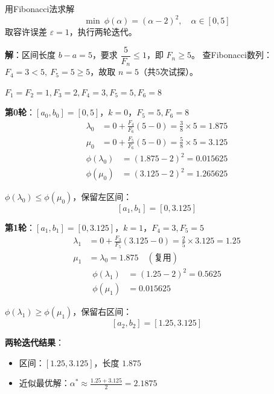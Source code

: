 \begin{example}\label{ex:fibonacci}
用Fibonacci法求解
\[
\min\ \phi(\alpha) = (\alpha - 2)^2,\quad \alpha \in [0, 5]
\]
取容许误差 $\varepsilon = 1$，执行两轮迭代。

\textbf{解}：区间长度 $b-a = 5$，要求 $\dfrac{5}{F_n} \leq 1$，即 $F_n \geq 5$。
查Fibonacci数列：$F_4=3 < 5,\ F_5=5 \geq 5$，故取 $n = 5$（共5次试探）。

$F_1=F_2=1, F_3=2, F_4=3, F_5=5, F_6=8$

\textbf{第0轮}：$[a_0, b_0] = [0, 5]$，$k=0$，$F_{5}=5, F_{6}=8$
\begin{align*}
\lambda_0 &= 0 + \frac{F_4}{F_6}(5-0) = \frac{3}{8} \times 5 = 1.875 \\
\mu_0 &= 0 + \frac{F_5}{F_6}(5-0) = \frac{5}{8} \times 5 = 3.125
\end{align*}
\begin{align*}
\phi(\lambda_0) &= (1.875 - 2)^2 = 0.015625 \\
\phi(\mu_0) &= (3.125 - 2)^2 = 1.265625
\end{align*}

$\phi(\lambda_0) \leq \phi(\mu_0)$，保留左区间：
\[
[a_1, b_1] = [0, 3.125]
\]

\textbf{第1轮}：$[a_1, b_1] = [0, 3.125]$，$k=1$，$F_{4}=3, F_{5}=5$
\begin{align*}
\lambda_1 &= 0 + \frac{F_3}{F_5}(3.125-0) = \frac{2}{5} \times 3.125 = 1.25 \\
\mu_1 &= \lambda_0 = 1.875 \quad (\text{复用})
\end{align*}
\begin{align*}
\phi(\lambda_1) &= (1.25 - 2)^2 = 0.5625 \\
\phi(\mu_1) &= 0.015625
\end{align*}

$\phi(\lambda_1) \geq \phi(\mu_1)$，保留右区间：
\[
[a_2, b_2] = [1.25, 3.125]
\]

\textbf{两轮迭代结果}：
\begin{itemize}
    \item 区间：$[1.25, 3.125]$，长度 $1.875$
    \item 近似最优解：$\alpha^* \approx \frac{1.25 + 3.125}{2} = 2.1875$
\end{itemize}
\end{example}

